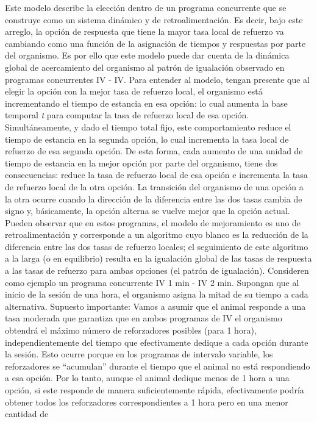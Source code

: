 \documentclass[
  letterpaper,
]{book}
\begin{document}
Este modelo describe la elección dentro de un programa concurrente que
se construye como un sistema dinámico y de retroalimentación. Es decir,
bajo este arreglo, la opción de respuesta que tiene la mayor tasa local
de refuerzo va cambiando como una función de la asignación de tiempos y
respuestas por parte del organismo. Es por ello que este modelo puede
dar cuenta de la dinámica global de acercamiento del organismo al patrón
de igualación observado en programas concurrentes IV - IV. Para entender
al modelo, tengan presente que al elegir la opción con la mejor tasa de
refuerzo local, el organismo está incrementando el tiempo de estancia en
esa opción: lo cual aumenta la base temporal \emph{t} para computar la
tasa de refuerzo local de esa opción. Simultáneamente, y dado el tiempo
total fijo, este comportamiento reduce el tiempo de estancia en la
segunda opción, lo cual incrementa la tasa local de refuerzo de esa
segunda opción. De esta forma, cada aumento de una unidad de tiempo de
estancia en la mejor opción por parte del organismo, tiene dos
consecuencias: reduce la tasa de refuerzo local de esa opción e
incrementa la tasa de refuerzo local de la otra opción. La transición
del organismo de una opción a la otra ocurre cuando la dirección de la
diferencia entre las dos tasas cambia de signo y, básicamente, la opción
alterna se vuelve mejor que la opción actual. Pueden observar que en
estos programas, el modelo de mejoramiento es uno de retroalimentación y
corresponde a un algoritmo cuyo blanco es la reducción de la diferencia
entre las dos tasas de refuerzo locales; el seguimiento de este
algoritmo a la larga (o en equilibrio) resulta en la igualación global
de las tasas de respuesta a las tasas de refuerzo para ambas opciones
(el patrón de igualación). Consideren como ejemplo un programa
concurrente IV 1 min - IV 2 min. Supongan que al inicio de la sesión de
una hora, el organismo asigna la mitad de su tiempo a cada alternativa.
Supuesto importante: Vamos a asumir que el animal responde a una tasa
moderada que garantiza que en ambos programas de IV el organismo
obtendrá el máximo número de reforzadores posibles (para 1 hora),
independientemente del tiempo que efectivamente dedique a cada opción
durante la sesión. Esto ocurre porque en los programas de intervalo
variable, los reforzadores se ``acumulan'' durante el tiempo que el
animal no está respondiendo a esa opción. Por lo tanto, aunque el animal
dedique menos de 1 hora a una opción, si este responde de manera
suficientemente rápida, efectivamente podría obtener todos los
reforzadores correspondientes a 1 hora pero en una menor cantidad de
\end{document}
